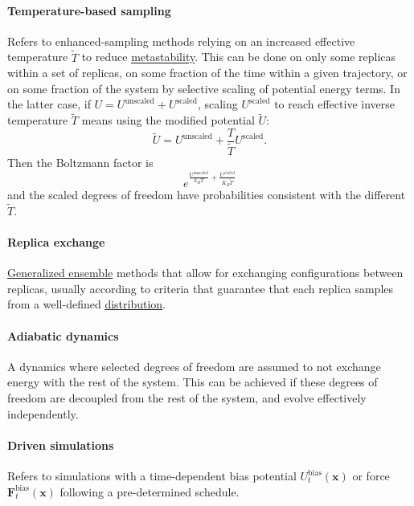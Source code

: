 \documentclass[9pt,review]{livecoms}
\newcommand{\vx}{\mathbf{x}}
\newcommand{\vF}{\mathbf{F}}
\begin{document}
\paragraph{Temperature-based sampling} Refers to enhanced-sampling methods relying on an increased effective temperature $\tilde T$ to reduce \hyperlink{ref:metastab} {metastability}. This can be done on only some replicas within a set of replicas, on some fraction of the time within a given trajectory, or on some fraction of the system by selective scaling of potential energy terms.
In the latter case, if $U = U^\mathrm{unscaled} + U^\mathrm{scaled}$, scaling $U^\mathrm{scaled}$ to reach effective inverse temperature $\tilde T$ means using the modified potential $\tilde U$:
\begin{equation}
\tilde U = U^\mathrm{unscaled} + \frac{T}{\tilde T} U^\mathrm{scaled}.
\end{equation}
Then the Boltzmann factor is
\begin{equation}
e^{\frac{U^\mathrm{unscaled}}{k_BT} + \frac{U^{scaled}}{K_B \tilde T}}
\end{equation}
and the scaled degrees of freedom have probabilities consistent with the different $\tilde T$.

\hypertarget{ref:ReplEx} {\paragraph{Replica exchange}} \hyperlink{ref:GenEns} {Generalized ensemble} methods that allow for exchanging configurations between replicas, usually according to criteria that guarantee that each replica samples from a well-defined \hyperlink{ref:Distribution} {distribution}.

\hypertarget{ref:AdiabaticDyn} {\paragraph{Adiabatic dynamics}}
A dynamics where selected degrees of freedom are assumed to not exchange energy with the rest of the system.
This can be achieved if these degrees of freedom are decoupled from the rest of the system, and evolve effectively independently.

\hypertarget{ref:Driven} {\paragraph{Driven simulations}} Refers to simulations with a time-dependent bias potential $U^{\mathrm{bias}}_t(\vx)$ or force $\vF^\mathrm{bias}_t(\vx)$ following a pre-determined schedule.
\end{document}
